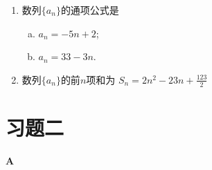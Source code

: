 \begin{ex}
\begin{enumerate}
\begin{enumerate}[(1)]
\item 数列$\{a_n\}$的通项公式是
\begin{multicols}{2}
    \begin{enumerate}[(a)]
        \item $a_n=-5n+2$;
        \item $a_n=33-3n$.
    \end{enumerate}
    \end{multicols}

\item 数列$\{a_n\}$的前$n$项和为 $S_n=2n^2-23n+\frac{123}{2}$
\end{enumerate}
\end{enumerate}
\end{ex}

\section*{习题二}
\begin{center}
    \bfseries A
\end{center}

